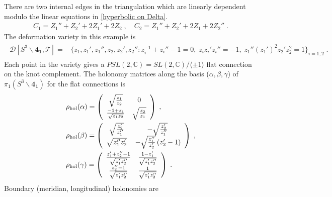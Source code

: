 \documentclass[a4paper,11pt]{article}
\def\cT{\mathcal{T}}
\begin{document}
%
There are two internal edges in the triangulation which are linearly dependent modulo the linear equations in \eqref{hyperbolic on Delta}.
%
\begin{align}
C_1 =Z_1''+Z_2'+2Z_1'+2Z_2\;, \quad C_2 = Z_1''+Z_2'+2Z_1+2Z_2''\;. \label{internal edges of 4_1}
\end{align}
%
The deformation variety in this example is
%
\begin{align}
\begin{split}
\mathcal{D}[S^3\backslash \mathbf{4_1},\cT] = & \{ z_1,z_1', z_1'',z_2,z_2',z_2'' : z_i^{-1}+z_i''-1=0,\; z_i z_i'z_i''=-1,\; z_1'' (z_1')^2  z_2' z_2^2 =1\}_{i=1,2}\;. 
\label{deformation variety-m004}
\end{split}
\end{align}
%
Each point in the variety gives a $PSL(2,\mathbb{C}) = SL(2,\mathbb{C})/\langle \pm 1 \rangle$ flat connection on the knot complement. 
The holonomy matrices along the basis ($\alpha, \beta,\gamma$) of $\pi_1 (S^3\backslash \mathbf{4_1})$ for the flat connections is 
%
\begin{align}
\begin{split}
& \rho_{\rm hol}(\alpha)= \left(
\begin{array}{cc}
 \sqrt{\frac{z_1}{z_2}} & 0 \\
 \frac{-1+z_1}{\sqrt{z_1 z_2}} & \sqrt{\frac{z_2}{z_1}} \\
\end{array}
\right) \;,
\\
& \rho_{\rm hol}(\beta)= \left(
\begin{array}{cc}
 \sqrt{\frac{z_2'}{z_1''}} &- \sqrt{\frac{z_2'}{z_1''}} \\
 \sqrt{z_1'' z_2'} & \, -\sqrt{\frac{z_1''}{z_2'}}\left(z_2'-1\right) \\
\end{array}
\right) \;,
\\
& \rho_{\rm hol}(\gamma)= \left(
\begin{array}{cc}
 \frac{z_1'+z_2''-1}{\sqrt{z_1' z_2''}} & \frac{1-z_1'}{\sqrt{z_1' z_2''}} \\
 \frac{z_2''-1}{\sqrt{z_1' z_2''}} & \frac{1}{\sqrt{z_1' z_2''}} \\
\end{array}
\right) \;.
\end{split}
\label{Hol-m004-1}
\end{align}
%
Boundary (meridian, longitudinal) holonomies  are
%
\end{document}

